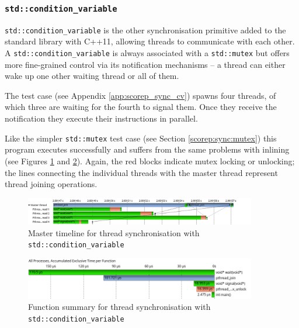 \subsubsection{\texttt{std::condition\_variable}}\label{scorep:sync:cv}

\texttt{std::condition\_variable} is the other synchronisation primitive added to the standard library with C++11, allowing threads to communicate with each other. A \texttt{std::condition\_variable} is always associated with a \texttt{std::mutex} but offers more fine-grained control via its notification mechanisms -- a thread can either wake up one other waiting thread or all of them.

The test case (see Appendix \ref{app:scorep_sync_cv}) spawns four threads, of which three are waiting for the fourth to signal them. Once they receive the notification they execute their instructions in parallel.

Like the simpler \texttt{std::mutex} test case (see Section \ref{scorep:sync:mutex}) this program executes successfully and suffers from the same problems with inlining (see Figures \ref{scorep:sync_pthread_cv_timeline} and \ref{scorep:sync_pthread_cv_summary}). Again, the red blocks indicate mutex locking or unlocking; the lines connecting the individual threads with the master thread represent thread joining operations.

\begin{figure}[htbp]
	\begin{center}
		\includegraphics[width=0.9\textwidth]{img/scorep_pthread_cv_timeline.png}
		\caption{Master timeline for thread synchronisation with \texttt{std::condition\_variable}}
		\label{scorep:sync_pthread_cv_timeline}
	\end{center}
\end{figure}

\begin{figure}[htbp]
	\begin{center}
		\includegraphics[width=0.9\textwidth]{img/scorep_pthread_cv_summary.png}
		\caption{Function summary for thread synchronisation with \texttt{std::condition\_variable}}
		\label{scorep:sync_pthread_cv_summary}
	\end{center}
\end{figure}

